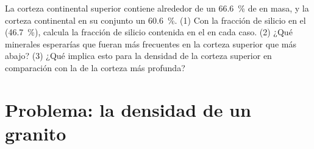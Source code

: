 \begin{exercise}[$\star\star\star$]\label{exo:g11:minerals:15}
La corteza continental superior contiene alrededor de un \qty{66.6}{\percent}
de  en masa, y la corteza continental en su conjunto un
\qty{60.6}{\percent}. (1) Con la fracción de silicio en el 
(\qty{46.7}{\percent}), calcula la fracción de silicio contenida en el 
en cada caso. (2) ¿Qué minerales esperarías que fueran más frecuentes en la
corteza superior que más abajo? (3) ¿Qué implica esto para la densidad de la
corteza superior en comparación con la de la corteza más profunda?
\end{exercise}

\section{Problema: la densidad de un granito}

